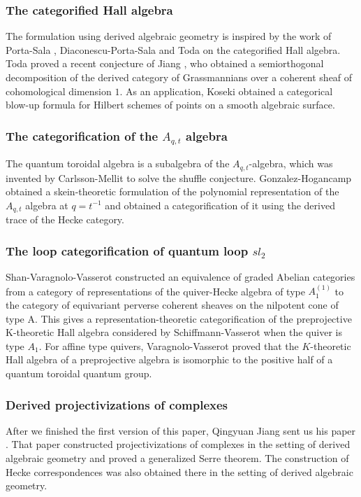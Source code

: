 \documentclass{amsart}
\numberwithin{equation}{section}
\theoremstyle{definition}
\theoremstyle{remark}
\begin{document}
\subsubsection{The categorified Hall algebra} The formulation using derived algebraic geometry is inspired by the work of Porta-Sala \cite{porta2019categorification}, Diaconescu-Porta-Sala \cite{diaconescu2020mckay} and Toda \cite{toda2019categorical,toda2020hall,toda2021categorical,toda2021derived} on the categorified Hall algebra. Toda \cite{toda2021derived} proved a recent conjecture of Jiang \cite{jiang2021derived}, who obtained a semiorthogonal decomposition of the derived category of Grassmannians over a coherent sheaf of cohomological dimension $1$. As an application, Koseki \cite{koseki2021categorical} obtained a categorical blow-up formula for Hilbert schemes of points on a smooth algebraic surface.
\subsubsection{The categorification of the $A_{q,t}$ algebra} The quantum toroidal algebra is a subalgebra of the $A_{q,t}$-algebra, which was invented by Carlsson-Mellit \cite{shuffle} to solve the shuffle conjecture. Gonzalez-Hogancamp \cite{GH} obtained a skein-theoretic formulation of the polynomial representation of the $A_{q,t}$ algebra at $q=t^{-1}$ and obtained a categorification of it using the derived trace of the Hecke category. 

\subsubsection{The loop categorification of quantum loop $sl_{2}$}
Shan-Varagnolo-Vasserot \cite{shan2019coherent} constructed an equivalence of graded Abelian categories from a category of representations of the quiver-Hecke algebra of type $A_{1}^{(1)}$ to the category of equivariant perverse coherent sheaves on the nilpotent cone of type A. This gives a representation-theoretic categorification of the preprojective K-theoretic Hall algebra considered by Schiffmann-Vasserot \cite{schiffmann2017cohomological} when the quiver is type $A_{1}$. For affine type quivers, Varagnolo-Vasserot \cite{Varagnolo2021}  proved that the $K$-theoretic Hall algebra of a preprojective algebra is isomorphic to the positive half of a quantum toroidal quantum group.

\subsubsection{Derived projectivizations of complexes}
After we finished the first version of this paper, Qingyuan Jiang sent us his paper \cite{jiang2022derived}. That paper constructed projectivizations of complexes in the setting of derived algebraic geometry and proved a generalized Serre theorem. The construction of Hecke correspondences was also obtained there in the setting of derived algebraic geometry.
\end{document}
